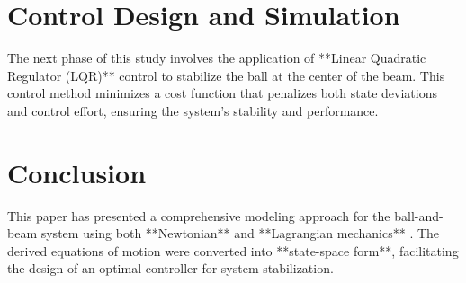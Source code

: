 \documentclass[conference]{IEEEtran}
\begin{document}
\section{Control Design and Simulation}
The next phase of this study involves the application of **Linear Quadratic Regulator (LQR)** control to stabilize the ball at the center of the beam. This control method minimizes a cost function that penalizes both state deviations and control effort, ensuring the system's stability and performance.

\section{Conclusion}
This paper has presented a comprehensive modeling approach for the ball-and-beam system using both **Newtonian** and **Lagrangian mechanics** \cite{bolivar2014}. The derived equations of motion were converted into **state-space form**, facilitating the design of an optimal controller for system stabilization.



\end{document}
